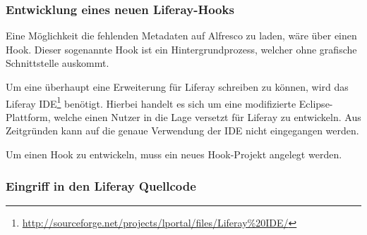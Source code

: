 \subsubsection{Entwicklung eines neuen Liferay-Hooks}
Eine M\"oglichkeit die fehlenden Metadaten auf Alfresco zu laden, w\"are \"uber einen Hook. Dieser sogenannte Hook ist ein Hintergrundprozess, welcher ohne grafische Schnittstelle auskommt. 

Um eine \"uberhaupt eine Erweiterung f\"ur Liferay schreiben zu k\"onnen, wird das Liferay IDE\footnote{\url{http://sourceforge.net/projects/lportal/files/Liferay\%20IDE/}} ben\"otigt. Hierbei handelt es sich um eine modifizierte Eclipse-Plattform, welche einen Nutzer in die Lage versetzt f\"ur Liferay zu entwickeln.
Aus Zeitgr\"unden kann auf die genaue Verwendung der IDE nicht eingegangen werden. 

Um einen Hook zu entwickeln, muss ein neues Hook-Projekt angelegt werden. 
\subsubsection{Eingriff in den Liferay Quellcode}